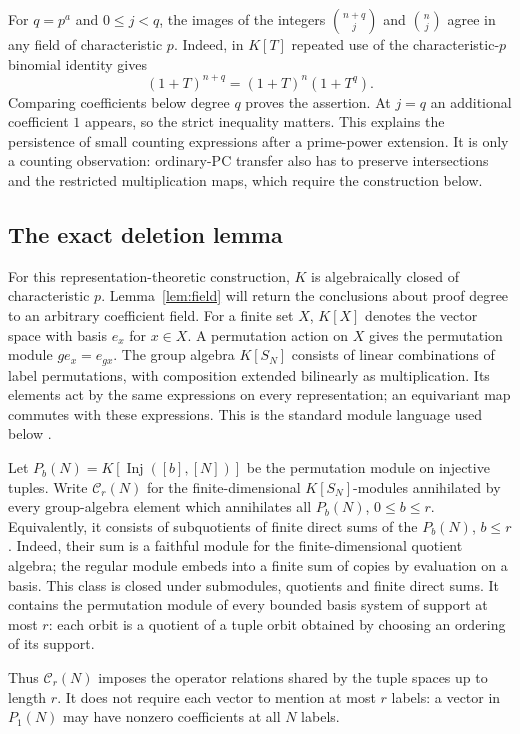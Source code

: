 \begin{remark}\label{rem:prime-power-counts}
For $q=p^a$ and $0\le j<q$, the images of the integers
$\binom{n+q}{j}$ and $\binom n j$ agree in any field of characteristic
$p$. Indeed, in $K[T]$ repeated use of the characteristic-$p$ binomial
identity gives
\[
 (1+T)^{n+q}=(1+T)^n(1+T^q).
\]
Comparing coefficients below degree $q$ proves the assertion. At
$j=q$ an additional coefficient $1$ appears, so the strict inequality
matters. This explains the persistence of small counting expressions
after a prime-power extension. It is only a counting observation:
ordinary-PC transfer also has to preserve intersections and the
restricted multiplication maps, which require the construction below.
\end{remark}

\subsection{The exact deletion lemma}
For this representation-theoretic construction, $K$ is algebraically
closed of characteristic $p$. Lemma~\ref{lem:field} will return the
conclusions about proof degree to an arbitrary coefficient field.
For a finite set $X$, $K[X]$ denotes the vector space with basis
$e_x$ for $x\in X$. A permutation action on $X$ gives the permutation
module $g e_x=e_{gx}$. The group algebra $K[S_N]$ consists of linear
combinations of label permutations, with composition extended
bilinearly as multiplication. Its elements act by the same expressions
on every representation; an equivariant map commutes with these
expressions. This is the standard module language used below
\cite{AlperinLocal}.

Let $P_b(N)=K[\operatorname{Inj}([b],[N])]$ be the permutation module on injective tuples. Write $\mathcal C_r(N)$ for the finite-dimensional $K[S_N]$-modules annihilated by every group-algebra element which annihilates all $P_b(N)$, $0\le b\le r$. Equivalently, it consists of subquotients of finite direct sums of the $P_b(N)$, $b\le r$. Indeed, their sum is a faithful module for the finite-dimensional quotient algebra; the regular module embeds into a finite sum of copies by evaluation on a basis. This class is closed under submodules, quotients and finite direct sums. It contains the permutation module of every bounded basis system of support at most $r$: each orbit is a quotient of a tuple orbit obtained by choosing an ordering of its support.

Thus $\mathcal C_r(N)$ imposes the operator relations shared by the
tuple spaces up to length $r$. It does not require each vector to
mention at most $r$ labels: a vector in $P_1(N)$ may have nonzero
coefficients at all $N$ labels.

